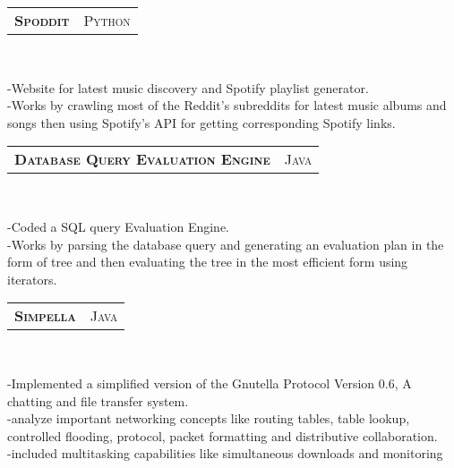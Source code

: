 \documentclass[10pt,a4paper,oneside]{article}
\begin{document}
\begin{minipage}[t]{0.63\textwidth}
        \begin{tabular}{c|c}
            \textbf{\normalsize S\textsc{poddit}}
            &\textmd{\normalsize P\textsc{ython}}
        \end{tabular}\\
         \vspace{-4mm}
        \begin{adjustwidth}{7pt}{0pt}
        {\footnotesize -Website for latest music
        discovery and Spotify playlist generator.\\
        -Works by crawling most of the Reddit's subreddits for
        latest music albums and songs then using Spotify's API for
        getting corresponding Spotify links.}\\
        \end{adjustwidth}
        \begin{tabular}{c|c}
            \textbf{\normalsize D\textsc{atabase} Q\textsc{uery}
            E\textsc{valuation} E\textsc{ngine}}
            &\textmd{\normalsize J\textsc{ava}}
        \end{tabular}\\
         \vspace{-4mm}
        \begin{adjustwidth}{7pt}{0pt}
        {\footnotesize -Coded a SQL query Evaluation Engine.\\
        -Works by parsing the database query and generating an evaluation plan in the form of tree and then evaluating the tree in the most efficient form using iterators.}\\
        \end{adjustwidth}
        \begin{tabular}{c|c}
            \textbf{\normalsize S\textsc{impella}}
            &\textmd{\normalsize J\textsc{ava}}
        \end{tabular}\\
         \vspace{-4mm}
        \begin{adjustwidth}{7pt}{0pt}
        {\footnotesize -Implemented a simplified version of the
        Gnutella Protocol Version 0.6, A chatting and file transfer
        system.\\
        -analyze important networking concepts like routing tables, table lookup, controlled
        flooding, protocol, packet formatting and distributive
        collaboration.\\
        -included multitasking capabilities like simultaneous
        downloads and monitoring}\\

\end{adjustwidth}
\end{minipage}
\end{document}
